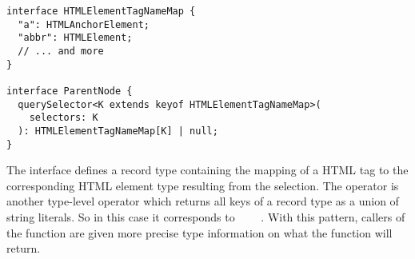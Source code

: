 \begin{lstlisting}
interface HTMLElementTagNameMap {
  "a": HTMLAnchorElement;
  "abbr": HTMLElement;
  // ... and more
}

interface ParentNode {
  querySelector<K extends keyof HTMLElementTagNameMap>(
    selectors: K
  ): HTMLElementTagNameMap[K] | null;
}
\end{lstlisting}

The  interface defines a record type containing the mapping of a HTML tag to the corresponding HTML element type resulting from the selection. The  operator is another type-level operator which returns all keys of a record type as a union of string literals. So in this case it corresponds to \ \ts{|}\  \ts{|}\ \,.  With this pattern, callers of the  function are given more precise type information on what the function will return.
